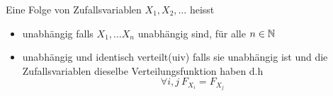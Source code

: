 \Def[2.8] \newline
Eine Folge von Zufallsvariablen \(X_1, X_2, \dots \) heisst
\begin{itemize}
    \item unabhängig falls \(X_1, \dots X_n \) unabhängig sind, für alle \(n \in  \mathbb{N}\)
    \item unabhängig und identisch verteilt(uiv) falls sie unabhängig ist und die Zufallsvariablen dieselbe Verteilungsfunktion haben d.h \[ \forall i, j \ F_{X_i} = F_{X_j}\]
\end{itemize}